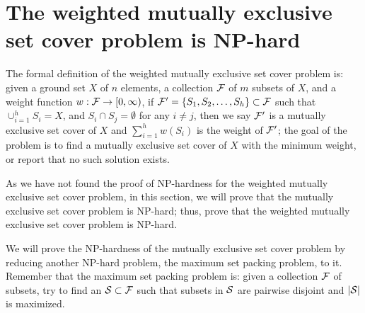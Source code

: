 \documentclass[11pt]{article}
\begin{document}
\section{The {\sc weighted mutually exclusive set cover} problem is NP-hard}
The formal definition of the {\sc weighted mutually exclusive set
cover} problem is: given a ground set $X$ of $n$ elements, a
collection ${\cal F}$ of $m$ subsets of $X$, and a weight function
$w: {\cal F} \rightarrow [0, \infty)$, if ${\cal F'}
=\{S_1,S_2,\ldots,S_h\} \subset {\cal F}$ such that
$\cup_{i=1}^hS_i=X$, and $S_i\cap S_j=\emptyset$ for any $i \neq
j$, then we say ${\cal F'}$ is a mutually exclusive set cover of
$X$ and $\sum_{i=1}^hw(S_i)$ is the weight of ${\cal F'}$; the
goal of the problem is to find a mutually exclusive set cover of
$X$ with the minimum weight, or report that no such solution
exists.

As we have not found the proof of NP-hardness for the {\sc
weighted mutually exclusive set cover} problem, in this section,
we will prove that the {\sc mutually exclusive set cover} problem
is NP-hard; thus, prove that the {\sc weighted mutually exclusive
set cover} problem is NP-hard.

We will prove the NP-hardness of the {\sc mutually exclusive set
cover} problem by reducing another NP-hard problem, the {\sc
maximum set packing} problem, to it. Remember that the {\sc
maximum set packing} problem is: given a collection ${\cal F}$ of
subsets, try to find an ${\cal S} \subset {\cal F}$ such that
subsets in ${\cal S}$ are pairwise disjoint and $|{\cal S}|$ is
maximized.
\end{document}
